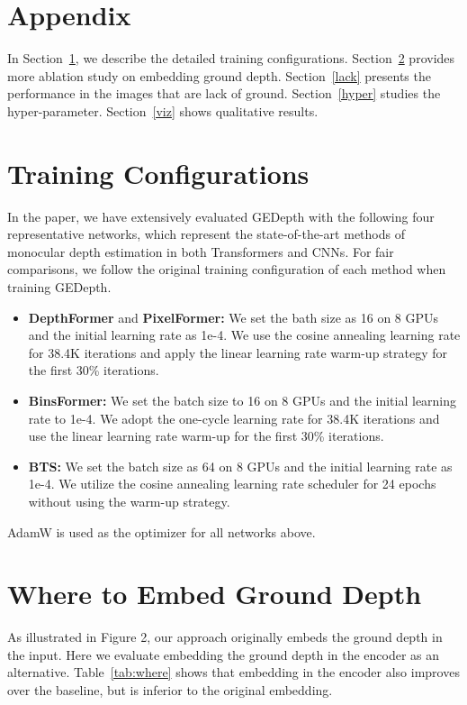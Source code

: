 \documentclass[10pt,twocolumn,letterpaper]{article}
\begin{document}
{\small


}

\appendix
\section*{Appendix}
In Section~\ref{config}, we describe the detailed training configurations. Section~\ref{where} provides more ablation study on embedding ground depth. Section~\ref{lack} presents the performance in the images that are lack of ground. Section~\ref{hyper} studies the hyper-parameter. Section~\ref{viz} shows qualitative results. 

\section{Training Configurations}
\label{config}
In the paper, we have extensively evaluated GEDepth with the following four representative networks, 
which represent the state-of-the-art methods of monocular depth estimation in both Transformers and CNNs. For fair comparisons, we follow the original training configuration of each method when training GEDepth.

\begin{itemize}[noitemsep,topsep=0pt]
\item \textbf{DepthFormer} and \textbf{PixelFormer:} We set the bath size as 16 on 8 GPUs and the initial learning rate as 1e-4. We use the cosine annealing learning rate for 38.4K iterations and apply the linear learning rate warm-up strategy for the first 30\% iterations. 
\item \textbf{BinsFormer:} We set the batch size to 16 on 8 GPUs and the initial learning rate to 1e-4. We adopt the one-cycle learning rate for 38.4K iterations and use the linear learning rate warm-up for the first 30\% iterations. 
\item \textbf{BTS:} We set the batch size as 64 on 8 GPUs and the initial learning rate as 1e-4. We utilize the cosine annealing learning rate scheduler for 24 epochs without using the warm-up strategy.
\end{itemize}

\noindent AdamW is used as the optimizer for all networks above. 

\section{Where to Embed Ground Depth}
\label{where}
As illustrated in Figure 2, our approach originally embeds the ground depth in the input. Here we evaluate embedding the ground depth in the encoder as an alternative. Table~\ref{tab:where} shows that embedding in the encoder also improves over the baseline, but is inferior to the original embedding. 
\end{document}

